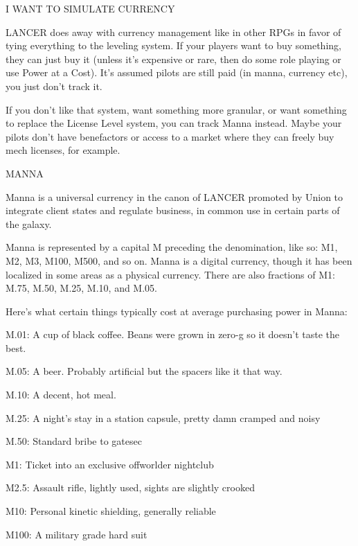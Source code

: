                                     I WANT TO SIMULATE CURRENCY  

LANCER does away with currency management like in other RPGs in favor of tying everything to  
the leveling system. If your players want to buy something, they can just buy it (unless it’s  
expensive or rare, then do some role playing or use Power at a Cost). It’s assumed pilots are  
still paid (in manna, currency etc), you just don’t track it.  

If you don’t like that system, want something more granular, or want something to replace the  
License Level system, you can track Manna instead. Maybe your pilots don’t have benefactors or  
access to a market where they can freely buy mech licenses, for example.
 

                                                     MANNA  

Manna is a universal currency in the canon of LANCER promoted by Union to integrate client  
states and regulate business, in common use in certain parts of the galaxy.
 

Manna is represented by a capital M preceding the denomination, like so: M1, M2, M3, M100,  
M500, and so on. Manna is a digital currency, though it has been localized in some areas as a  
physical currency. There are also fractions of M1: M.75, M.50, M.25, M.10, and M.05.
 

Here’s what certain things typically cost at average purchasing power in Manna:
 

                                                                                                                


M.01: A cup of black coffee. Beans were grown in zero-g so it doesn’t taste the best.
 
M.05: A beer. Probably artificial but the spacers like it that way.
 
M.10: A decent, hot meal.
 
M.25: A night’s stay in a station capsule, pretty damn cramped and noisy
 
M.50: Standard bribe to gatesec
 
M1: Ticket into an exclusive offworlder nightclub
 
M2.5: Assault rifle, lightly used, sights are slightly crooked
 
M10: Personal kinetic shielding, generally reliable
 
M100: A military grade hard suit
 
